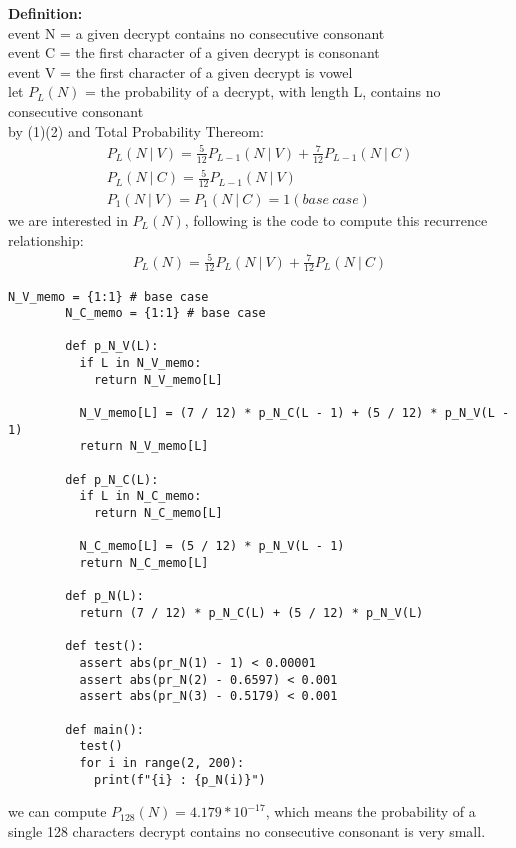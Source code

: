 \documentclass[12pt,letterpaper]{article}
\begin{document}
    \textbf{Definition:} \\
    event N = a given decrypt contains no consecutive consonant\\
    event C = the first character of a given decrypt is consonant\\
    event V = the first character of a given decrypt is vowel\\
    let $P_L(N)$ = the probability of a decrypt, with length L, contains no consecutive consonant\\
    by (1)(2) and Total Probability Thereom:
    \begin{align}
      P_L(N \ | \ V) = \frac{5}{12}P_{L-1}(N \ | \ V) +  \frac{7}{12}P_{L-1}(N \ | \ C) \\
      P_L(N \ | \ C) = \frac{5}{12}P_{L-1}(N \ | \ V)\\
      P_1(N \ | \ V) = P_1(N \ | \ C) = 1 (base \ case)
    \end{align}
    we are interested in $P_L(N)$, following is the code to compute this recurrence relationship:
    \begin{align}
      P_L(N) = \frac{5}{12}P_L(N \ | \ V) +  \frac{7}{12}P_L(N \ | \ C)
    \end{align}
    \begin{lstlisting}[style = Python]
        N_V_memo = {1:1} # base case
        N_C_memo = {1:1} # base case

        def p_N_V(L):
          if L in N_V_memo:
            return N_V_memo[L]
        
          N_V_memo[L] = (7 / 12) * p_N_C(L - 1) + (5 / 12) * p_N_V(L - 1)
          return N_V_memo[L]
        
        def p_N_C(L):
          if L in N_C_memo:
            return N_C_memo[L]
        
          N_C_memo[L] = (5 / 12) * p_N_V(L - 1)
          return N_C_memo[L]
        
        def p_N(L):
          return (7 / 12) * p_N_C(L) + (5 / 12) * p_N_V(L)
        
        def test():
          assert abs(pr_N(1) - 1) < 0.00001
          assert abs(pr_N(2) - 0.6597) < 0.001
          assert abs(pr_N(3) - 0.5179) < 0.001

        def main():
          test()
          for i in range(2, 200): 
            print(f"{i} : {p_N(i)}")
    \end{lstlisting}
     we can compute $P_{128}(N) = 4.179*10^{-17}$, which means the probability of a single 128 characters decrypt contains no consecutive consonant is very small.\\\\
\end{document}
